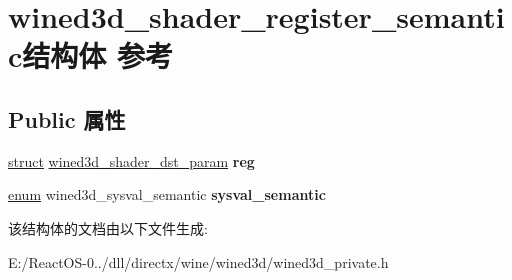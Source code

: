 \hypertarget{structwined3d__shader__register__semantic}{}\section{wined3d\+\_\+shader\+\_\+register\+\_\+semantic结构体 参考}
\label{structwined3d__shader__register__semantic}
\subsection*{Public 属性}
\begin{DoxyCompactItemize}
\item 
\mbox{\label{structwined3d__shader__register__semantic_af77ee8445382b6746eee817053115ae8}} 
\hyperlink{interfacestruct}{struct} \hyperlink{structwined3d__shader__dst__param}{wined3d\+\_\+shader\+\_\+dst\+\_\+param} {\bfseries reg}
\item 
\mbox{\label{structwined3d__shader__register__semantic_ab65ccbd008ab253bfaceb5f0b288ea5a}} 
\hyperlink{interfaceenum}{enum} wined3d\+\_\+sysval\+\_\+semantic {\bfseries sysval\+\_\+semantic}
\end{DoxyCompactItemize}


该结构体的文档由以下文件生成\+:\begin{DoxyCompactItemize}
\item 
E\+:/\+React\+O\+S-\/0../dll/directx/wine/wined3d/wined3d\+\_\+private.\+h\end{DoxyCompactItemize}
